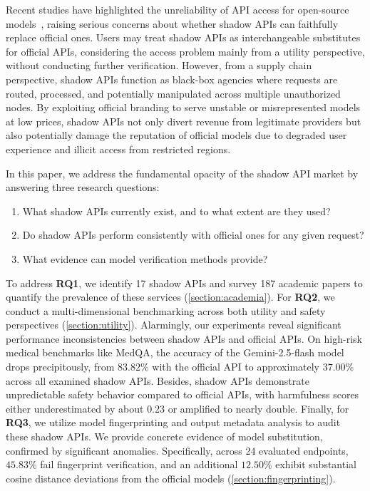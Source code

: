 \documentclass[letterpaper,twocolumn,10pt]{article}
\begin{document}
Recent studies have highlighted the unreliability of API access for open-source models~\cite{CSZS25,GLGC2024,SLZJZH24}, raising serious concerns about whether shadow APIs can faithfully replace official ones.
Users may treat shadow APIs as interchangeable substitutes for official APIs, considering the access problem mainly from a utility perspective, without conducting further verification.
However, from a supply chain perspective, shadow APIs function as black-box agencies where requests are routed, processed, and potentially manipulated across multiple unauthorized nodes. 
By exploiting official branding to serve unstable or misrepresented models at low prices, shadow APIs not only divert revenue from legitimate providers but also potentially damage the reputation of official models due to degraded user experience and illicit access from restricted regions.

In this paper, we address the fundamental opacity of the shadow API market by answering three research questions:

\begin{enumerate}[label=\textbf{RQ\arabic*:}, leftmargin=*, labelsep=0.5em, itemsep=0.5em]
    \item What shadow APIs currently exist, and to what extent are they used?
    \item Do shadow APIs perform consistently with official ones for any given request?
    \item What evidence can model verification methods provide?
\end{enumerate}

To address \textbf{RQ1}, we identify 17 shadow APIs and survey 187 academic papers to quantify the prevalence of these services (\autoref{section:academia}).
For \textbf{RQ2}, we conduct a multi-dimensional benchmarking across both utility and safety perspectives (\autoref{section:utility}).
Alarmingly, our experiments reveal significant performance inconsistencies between shadow APIs and official APIs.
On high-risk medical benchmarks like MedQA, the accuracy of the Gemini-2.5-flash model drops precipitously, from $83.82\%$ with the official API to approximately $37.00\%$ across all examined shadow APIs.
Besides, shadow APIs demonstrate unpredictable safety behavior compared to official APIs, with harmfulness scores either underestimated by about $0.23$ or amplified to nearly double.
Finally, for \textbf{RQ3}, we utilize model fingerprinting and output metadata analysis to audit these shadow APIs. 
We provide concrete evidence of model substitution, confirmed by significant anomalies.
Specifically, across 24 evaluated endpoints, $45.83\%$ fail fingerprint verification, and an additional $12.50\%$ exhibit substantial cosine distance deviations from the official models (\autoref{section:fingerprinting}).
\end{document}
